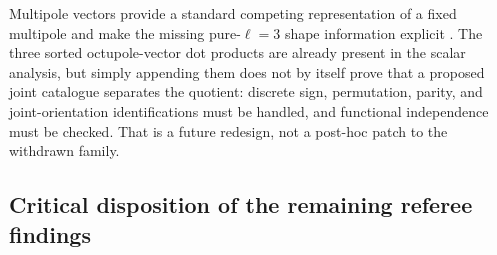 \documentclass[11pt,a4paper]{article}
\begin{document}
Multipole vectors provide a standard competing representation of a fixed
multipole and make the missing pure-$\ell=3$ shape information explicit
\cite{CopiHutererStarkman2004,Weeks2004,SchwarzEtAl2016}.  The three sorted
octupole-vector dot products are already present in the scalar analysis, but
simply appending them does not by itself prove that a proposed joint catalogue
separates the quotient: discrete sign, permutation, parity, and joint-orientation
identifications must be handled, and functional independence must be checked.
That is a future redesign, not a post-hoc patch to the withdrawn family.

\subsection{Critical disposition of the remaining referee findings}
\end{document}
